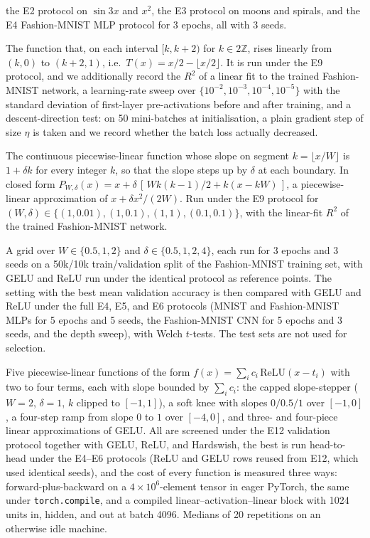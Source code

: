 \documentclass[11pt]{article}
\begin{document}
\begin{description}[nosep,leftmargin=1.5em]
        the E2 protocol on $\sin 3x$ and $x^2$, the E3 protocol on moons and spirals, and the E4
        Fashion-MNIST MLP protocol for 3 epochs, all with 3 seeds.
  \item[E10: Sawtooth function.] The function that, on each interval $[k,k+2)$ for $k\in 2\mathbb Z$,
        rises linearly from $(k,0)$ to $(k+2,1)$, i.e.\ $T(x)=x/2-\lfloor x/2\rfloor$. It is run under the
        E9 protocol, and we additionally record the $R^2$ of a linear fit to the trained Fashion-MNIST
        network, a learning-rate sweep over $\{10^{-2},10^{-3},10^{-4},10^{-5}\}$ with the standard
        deviation of first-layer pre-activations before and after training, and a descent-direction test:
        on 50 mini-batches at initialisation, a plain gradient step of size $\eta$ is taken and we record
        whether the batch loss actually decreased.
  \item[E11: Slope-stepping function.] The continuous piecewise-linear function whose slope on segment
        $k=\lfloor x/W\rfloor$ is $1+\delta k$ for every integer $k$, so that the slope steps up by
        $\delta$ at each boundary. In closed form
        $P_{W,\delta}(x)=x+\delta\,[\,W k(k-1)/2 + k(x-kW)\,]$, a piecewise-linear approximation of
        $x+\delta x^2/(2W)$. Run under the E9 protocol for $(W,\delta)\in\{(1,0.01),(1,0.1),(1,1),(0.1,0.1)\}$,
        with the linear-fit $R^2$ of the trained Fashion-MNIST network.
  \item[E12: Tuned slope-stepping function versus GELU.] A grid over $W\in\{0.5,1,2\}$ and
        $\delta\in\{0.5,1,2,4\}$, each run for 3 epochs and 3 seeds on a 50k/10k train/validation split
        of the Fashion-MNIST training set, with GELU and ReLU run under the identical protocol as
        reference points. The setting with the best mean validation accuracy is then compared with GELU
        and ReLU under the full E4, E5, and E6 protocols (MNIST and Fashion-MNIST MLPs for 5 epochs and
        5 seeds, the Fashion-MNIST CNN for 5 epochs and 3 seeds, and the depth sweep), with Welch
        $t$-tests. The test sets are not used for selection.
  \item[E13: Bounded-slope candidates.] \sloppy Five piecewise-linear functions of the form
        $f(x)=\sum_i c_i\,\mathrm{ReLU}(x-t_i)$ with two to four terms, each with slope bounded by
        $\sum_i c_i$: the capped slope-stepper ($W=2$, $\delta=1$, $k$ clipped to $[-1,1]$), a soft
        knee with slopes $0/0.5/1$ over $[-1,0]$, a four-step ramp from slope $0$ to $1$ over $[-4,0]$,
        and three- and four-piece linear approximations of GELU. All are screened under the E12
        validation protocol together with GELU, ReLU, and Hardswish, the best is run head-to-head under
        the E4--E6 protocols (ReLU and GELU rows reused from E12, which used identical seeds), and the
        cost of every function is measured three ways: forward-plus-backward on a $4\times10^6$-element
        tensor in eager PyTorch, the same under \texttt{torch.compile}, and a compiled
        linear--activation--linear block with 1024 units in, hidden, and out at batch 4096. Medians of 20
        repetitions on an otherwise idle machine.
\end{description}
\end{document}
